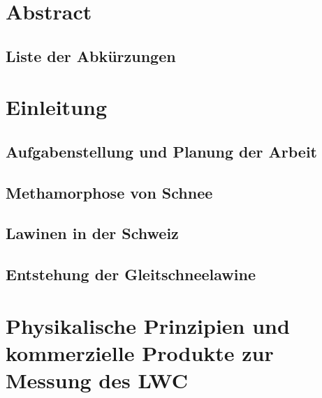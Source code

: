\documentclass[a4paper,12pt]{article}
\begin{document}
\begin{titlepage}
  \end{titlepage}



\pagestyle{empty}
\section*{Abstract}


\newpage
\subsection*{Liste der Abkürzungen}

\newpage
\tableofcontents
\newpage
\pagestyle{fancy}

\setcounter{page}{1}
\section{Einleitung}


\subsection{Aufgabenstellung und Planung der Arbeit}


\subsection{Methamorphose von Schnee}


\newpage
\subsection{Lawinen in der Schweiz}


\subsection{Entstehung der Gleitschneelawine}


%
\newpage
\section{Physikalische Prinzipien und kommerzielle Produkte zur Messung des LWC}

\end{document}
